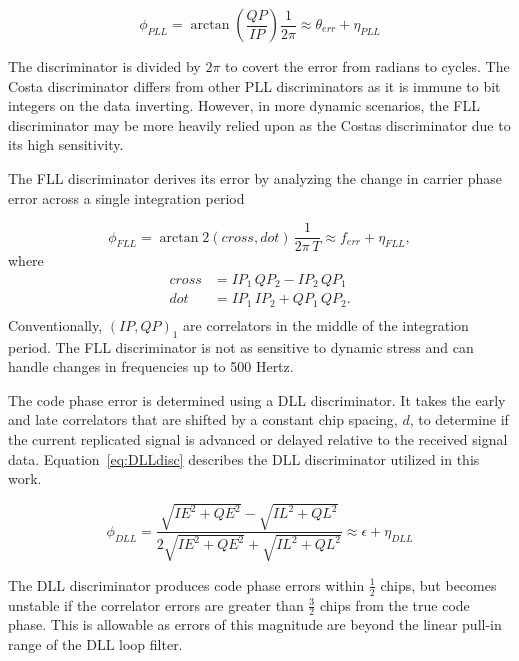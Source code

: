 \begin{equation}\label{eq:PLLdisc}
    \phi_{PLL} = \arctan\left(\frac{QP}{IP}\right) \frac{1}{2\pi} \approx \theta_{err} + \eta_{PLL}
\end{equation}

The discriminator is divided by \(2 \pi \) to covert the error from radians to cycles. The Costa discriminator differs from other PLL discriminators as it is immune to bit integers on the data inverting. However, in more dynamic scenarios, the FLL discriminator may be more heavily relied upon as the Costas discriminator due to its high sensitivity.

The FLL discriminator derives its error by analyzing the change in carrier phase error across a single integration period

\begin{equation}\label{eq:FLLdisc}
    \phi_{FLL} = \arctan2\left(cross,dot\right) \, \frac{1}{2\pi \,T} \approx f_{err} + \eta_{FLL},
\end{equation}
where
\begin{equation}\label{eq:crossdot}
    \begin{split}
        cross & = IP_1\,QP_2 - IP_2\,QP_1\\
        dot & = IP_1\,IP_2 + QP_1\,QP_2. \\
    \end{split}
\end{equation}
Conventionally, \(\left(IP,QP\right)_1\) are correlators in the middle of the integration period. The FLL discriminator is not as sensitive to dynamic stress and can handle changes in frequencies up to 500 Hertz.

The code phase error is determined using a DLL discriminator. It takes the early and late correlators that are shifted by a constant chip spacing, \(d\), to determine if the current replicated signal is advanced or delayed relative to the received signal data. Equation~\ref{eq:DLLdisc} describes the DLL discriminator utilized in this work.

\begin{equation}\label{eq:DLLdisc}
    \phi_{DLL} = \frac{\sqrt{IE^2 + QE^2} - \sqrt{IL^2 + QL^2}}{2 \sqrt{IE^2 + QE^2} + \sqrt{IL^2 + QL^2}} \approx \epsilon + \eta_{DLL}
\end{equation}

The DLL discriminator produces code phase errors within \(\frac{1}{2}\) chips, but becomes unstable if the correlator errors are greater than \(\frac{3}{2}\) chips from the true code phase. This is allowable as errors of this magnitude are beyond the linear pull-in range of the DLL loop filter.


